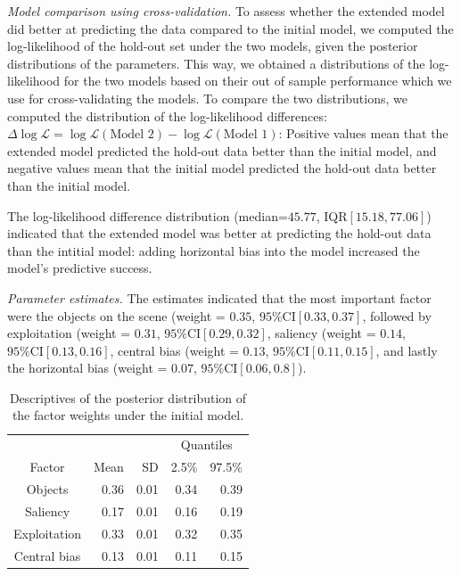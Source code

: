 \documentclass{article}
\begin{document}
\textit{Model comparison using cross-validation.} To assess whether the extended model did better at predicting the data compared to the initial model, we computed the log-likelihood of the hold-out set under the two models, given the posterior distributions of the parameters. This way, we obtained a distributions of the log-likelihood for the two models based on their out of sample performance which we use for cross-validating the models. To compare the two distributions, we computed the distribution of the log-likelihood differences: $\Delta \log \mathcal{L} = \log \mathcal{L}(\text{Model 2}) - \log \mathcal{L}(\text{Model 1})$: Positive values mean that the extended model predicted the hold-out data better than the initial model, and negative values mean that the initial model predicted the hold-out data better than the initial model.

The log-likelihood difference distribution (median=$45.77$, IQR$[15.18, 77.06]$) indicated that the extended model was better at predicting the hold-out data than the intitial model: adding horizontal bias into the model increased the model's predictive success.

\textit{Parameter estimates.} The estimates indicated that the most important factor were the objects on the scene (weight = $0.35$, $95\%\text{CI}[0.33, 0.37]$, followed by exploitation (weight = $0.31$, $95\%\text{CI}[0.29, 0.32]$, saliency (weight = $0.14$, $95\%\text{CI}[0.13, 0.16]$, central bias (weight = $0.13$, $95\%\text{CI}[0.11, 0.15]$, and lastly the horizontal bias (weight = $0.07$, $95\%\text{CI}[0.06, 0.8]$).

\begin{table}
    \centering
\begin{tabular}{c r r r r}
\toprule
\multicolumn{3}{c}{} & \multicolumn{2}{c}{Quantiles} \\
\cmidrule{4-5}
Factor & Mean & SD & 2.5\% & 97.5\%\\
\hline
Objects & 0.36 & 0.01 & 0.34 & 0.39\\
Saliency & 0.17 & 0.01 & 0.16 & 0.19\\
Exploitation &0.33 & 0.01 & 0.32 & 0.35\\
Central bias & 0.13 & 0.01 & 0.11 & 0.15\\
\bottomrule
\end{tabular}
    \caption{Descriptives of the posterior distribution of the factor weights under the initial model.}
    \label{tab:weights_model}
\end{table}
\end{document}
